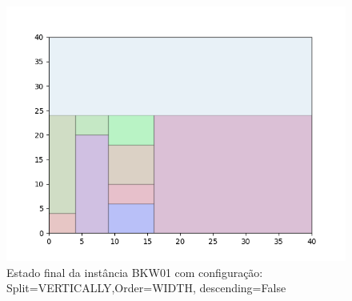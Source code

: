 \begin{figure}[H]
    \centering
    \caption[]{Estado final da instância BKW01 com configuração: Split=VERTICALLY,Order=WIDTH, descending=False}
    \label{fig:bkw01-vertically-width-false}
    \includegraphics[scale=0.5]{output/figures/bkw/bkw01/vertically/width/false/00}
\end{figure}